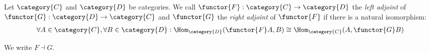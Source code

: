 \documentclass[DIN, pagenumber=false, fontsize=11pt, parskip=half, colorinlistoftodos, svgnames]{scrartcl}
\newcommand{\notimportantnote}[2][]{\todo[color=LightPink, #1]{#2}}
\begin{document}
	
	
	
	\begin{definition}[Adjunction]
		\label{def: adjunction}
		Let $\category{C}$ and $\category{D} $ be categories. We call $\functor{F}: \category{C} \rightarrow \category{D} $ the \emph{left adjoint} of $\functor{G}: \category{D} \rightarrow \category{C} $ and $\functor{G} $ the \emph{right adjoint} of $\functor{F} $ if there is a natural isomorphism:
		\begin{align*}
			\forall A \in \category{C}, \forall B \in \category{D}:
			\Hom_\category{D}(\functor{F}A, B) 
			\cong \Hom_\category{C}(A, \functor{G}B)
		\end{align*}
		
		We write $F \dashv G$.
	\end{definition}
	
\end{document}
